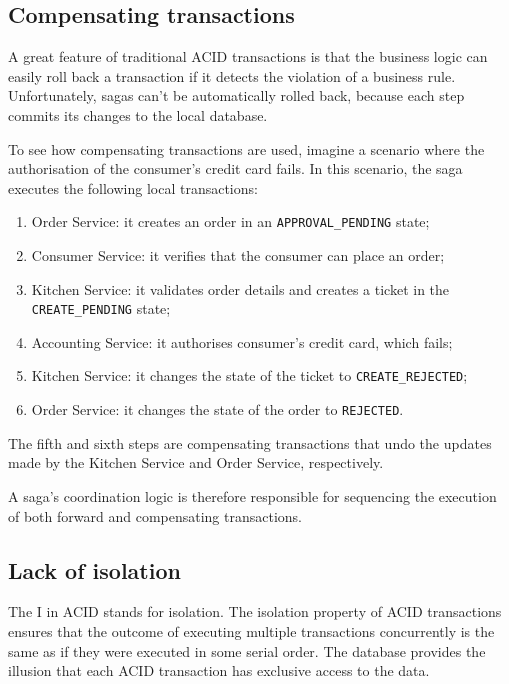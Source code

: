 \documentclass[conference]{IEEEtran}
\begin{document}
\subsection{Compensating transactions}

A great feature of traditional ACID transactions is that the business logic can easily roll back a transaction if it detects the violation of a business rule. Unfortunately, sagas can’t be automatically rolled back, because each step commits its changes to the local database. 

To see how compensating transactions are used, imagine a scenario where the authorisation of the consumer’s credit card fails. In this scenario, the saga executes the following local transactions:

\begin{enumerate}
  \item Order Service: it creates an order in an \texttt{APPROVAL\_PENDING} state;
  \item Consumer Service: it verifies that the consumer can place an order;
  \item Kitchen Service: it validates order details and creates a ticket in the \texttt{CREATE\_PENDING} state;
  \item Accounting Service: it authorises consumer’s credit card, which fails;
  \item Kitchen Service: it changes the state of the ticket to \texttt{CREATE\_REJECTED};
  \item Order Service: it changes the state of the order to \texttt{REJECTED}.
\end{enumerate}

The fifth and sixth steps are compensating transactions that undo the updates made by the Kitchen Service and Order Service, respectively.

A saga’s coordination logic is therefore responsible for sequencing the execution of both forward and compensating transactions. \cite{microservices-patterns-saga}

\subsection{Lack of isolation}

The I in ACID stands for isolation. The isolation property of ACID transactions ensures that the outcome of executing multiple transactions concurrently is the same as if they were executed in some serial order. The database provides the illusion that each ACID transaction has exclusive access to the data.
\end{document}
